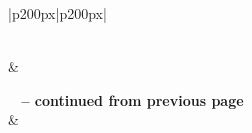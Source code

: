 \begin{longtable}{|p{200px}|p{200px}|}
\caption[Backlog]{Backlog} \label{backlog} \\

\hline {} &  \\
\endfirsthead

%
{{\bfseries \tablename\ \thetable{} -- continued from previous page}} \\
\hline {} &
 \\ \hline 
\endhead

\hline %
\endfoot


\end{longtable}
